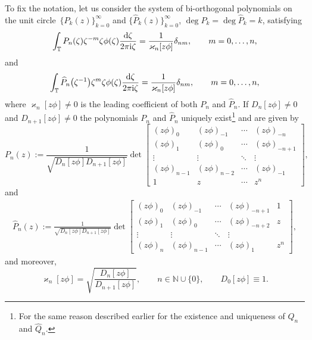 \documentclass[pdftex]{sigma}
\numberwithin{equation}{section}
\newcommand{\N}{{\mathbb N}}
\newcommand{\T}{{\mathbb T}}
\newcommand{\de}{\delta}
\newcommand{\ze}{\zeta}
\newcommand{\ii}{{\rm i}}
\newcommand{\dd}{{\rm d}}
\begin{document}
	To fix the notation, let us consider the system of bi-orthogonal polynomials on the unit circle~$\{P_k(z)\}^{\infty}_{k=0}$ and $\big\{\widehat{P}_k(z)\big\}^{\infty}_{k=0}$, $\deg P_k = \deg \widehat{P}_k = k$, satisfying
	\begin{equation}\label{orth zphi}
		\int_{\T} P_n(\ze)\ze^{-m}\ze\phi(\ze)\frac{\dd \ze}{2\pi \ii \ze}= \frac{1}{\varkappa_n[z\phi]} \de_{nm}, \qquad m =0, \dots,n,
	\end{equation}
	and
	\[
		\int_{\T} \widehat{P}_n\big(\ze^{-1}\big)\ze^{m}\ze\phi(\ze)\frac{\dd \ze}{2\pi \ii \ze}=\frac{1}{\varkappa_n[z\phi]} \de_{nm}, \qquad m =0, \dots,n,
	\]
	where $\varkappa_n[z\phi] \neq 0$ is the leading coefficient of both $P_n$ and $\widehat{P}_n$. If $D_n[z\phi] \neq 0$ and $D_{n+1}[z\phi] \neq 0$ the polynomials $P_n$ and $\widehat{P}_n$ uniquely exist\footnote{For the same reason described earlier for the existence and uniqueness of $Q_n$ and $\widehat{Q}_n$.} and are given by
	\begin{equation}\label{Toeplitz OP zphi}
		P_n(z):= \frac{1}{\sqrt{D_n[z\phi] D_{n+1}[z\phi]}} \det \begin{bmatrix}
			(z\phi)_0 & (z\phi)_{-1} & \cdots & (z\phi)_{-n} \\
			(z\phi)_1 & (z\phi)_{0} & \cdots & (z\phi)_{-n+1} \\
			\vdots & \vdots & \ddots & \vdots \\
			(z\phi)_{n-1} & (z\phi)_{n-2} & \cdots & (z\phi)_{-1} \\
			1 & z & \cdots & z^n
		\end{bmatrix},
	\end{equation}
	and
	\begin{gather*}%
		\widehat{P}_n(z) := \frac{1}{\sqrt{D_n[z\phi] D_{n+1}[z\phi]}} \det \begin{bmatrix}
			(z\phi)_0 & (z\phi)_{-1} & \cdots & (z\phi)_{-n+1} & 1 \\
			(z\phi)_1 & (z\phi)_{0} & \cdots & (z\phi)_{-n+2} & z \\
			\vdots & \vdots & \ddots & \vdots \\
			(z\phi)_{n} & (z\phi)_{n-1} & \cdots & (z\phi)_{1} & z^n
		\end{bmatrix},
	\end{gather*}
	and moreover,
	\begin{equation}\label{kappa zphi}
		\varkappa_n[z\phi] = \sqrt{\frac{D_{n}[z\phi]}{D_{n+1}[z\phi]}}, \qquad n \in \N \cup \{0\}, \qquad D_0[z\phi] \equiv 1.
	\end{equation}
	
\end{document}
